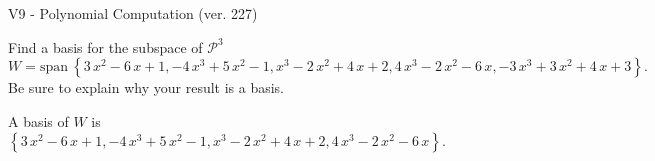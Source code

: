 \begin{exercise}
  \begin{exerciseTitle}V9 - Polynomial Computation (ver. 227)\end{exerciseTitle}
  \begin{exerciseStatement}
    Find a basis for the subspace of \(\mathcal{P}^3\) 
\[W=\mathrm{span}\ \left\{3 \, x^{2} - 6 \, x + 1 , -4 \, x^{3} + 5 \, x^{2} - 1 , x^{3} - 2 \, x^{2} + 4 \, x + 2 , 4 \, x^{3} - 2 \, x^{2} - 6 \, x , -3 \, x^{3} + 3 \, x^{2} + 4 \, x + 3\right\}.\]
 Be sure to explain why your result is a basis.


  \end{exerciseStatement}
  \begin{exerciseAnswer}
   A basis of \(W\) is  \(\left\{3 \, x^{2} - 6 \, x + 1 , -4 \, x^{3} + 5 \, x^{2} - 1 , x^{3} - 2 \, x^{2} + 4 \, x + 2 , 4 \, x^{3} - 2 \, x^{2} - 6 \, x\right\}\).
  


  \end{exerciseAnswer}
\end{exercise}